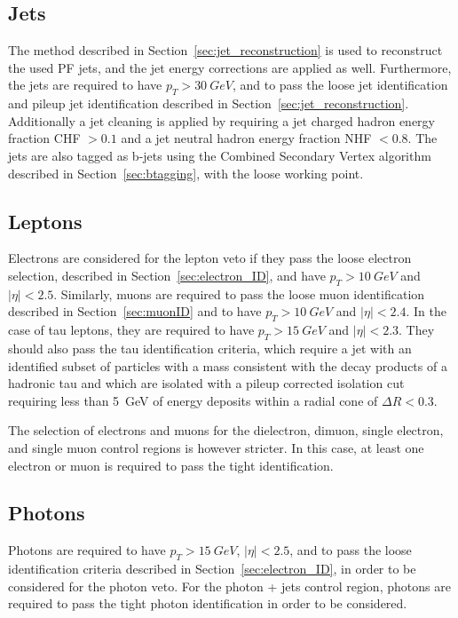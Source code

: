 \subsection{Jets}

The method described in Section~\ref{sec:jet_reconstruction} is used to reconstruct the used \ac{PF} jets, and the jet energy corrections are applied as well. Furthermore, the jets are required to have $p_T > \SI{30}{GeV}$, and to pass the loose jet identification and pileup jet identification described in Section~\ref{sec:jet_reconstruction}. Additionally a jet cleaning is applied by requiring a jet charged hadron energy fraction CHF $> 0.1$ and a jet neutral hadron energy fraction NHF $< 0.8$. The jets are also tagged as b-jets using the Combined Secondary Vertex algorithm described in Section~\ref{sec:btagging}, with the loose working point.

\subsection{Leptons}

Electrons are considered for the lepton veto if they pass the loose electron selection, described in Section~\ref{sec:electron_ID}, and have $p_T > \SI{10}{GeV}$ and $|\eta| < 2.5$. Similarly, muons are required to pass the loose muon identification described in Section~\ref{sec:muonID} and to have $p_T > \SI{10}{GeV}$ and $|\eta| < 2.4$. In the case of tau leptons, they are required to have $p_T > \SI{15}{GeV}$ and $|\eta| < 2.3$. They should also pass the tau identification criteria, which require a jet with an identified subset of particles with a mass consistent with the decay products of a hadronic tau and which are isolated with a pileup corrected isolation cut requiring less than \SI{5}{GeV} of energy deposits within a radial cone of $\Delta R < 0.3$. 

The selection of electrons and muons for the dielectron, dimuon, single electron, and single muon control regions is however stricter. In this case, at least one electron or muon is required to pass the tight identification.

\subsection{Photons}

Photons are required to have $p_T > \SI{15}{GeV}$, $|\eta| < 2.5$, and to pass the loose identification criteria described in Section~\ref{sec:electron_ID}, in order to be considered for the photon veto. For the photon + jets control region, photons are required to pass the tight photon identification in order to be considered.


